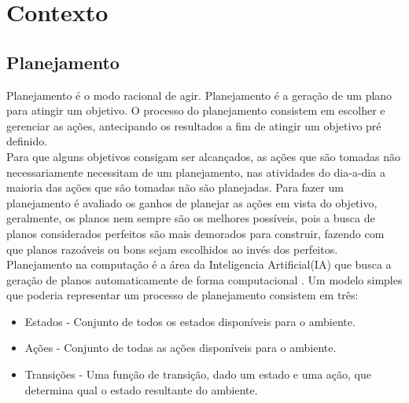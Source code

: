 \chapter{\label{chap:conte}Contexto}


\section{Planejamento} 


Planejamento é o modo racional de agir. Planejamento é a geração de um plano para atingir um objetivo. O processo do planejamento consistem em escolher e gerenciar as ações, antecipando os resultados a fim de atingir um objetivo pré definido. \\
Para que alguns objetivos consigam ser alcançados, as ações que são tomadas não necessariamente necessitam de um planejamento, nas atividades do dia-a-dia a maioria das ações que são tomadas não são planejadas. Para fazer um planejamento é avaliado os ganhos de planejar as ações em vista do objetivo, geralmente, os planos nem sempre são os melhores possíveis, pois a busca de planos considerados perfeitos são mais demorados para construir, fazendo com que planos razoáveis ou bons sejam escolhidos ao invés dos perfeitos. \\
Planejamento na computação é a área da Inteligencia Artificial(IA) que busca a geração de planos automaticamente de forma computacional \cite{ghallab2004automated}. Um modelo simples que poderia representar um processo de planejamento consistem em três:
 
\begin{itemize}
	\item Estados - Conjunto de todos os estados disponíveis para o ambiente. 
	\item Ações - Conjunto de todas as ações disponíveis para o ambiente.
	\item Transições - Uma função de transição, dado um estado e uma ação, que determina qual o estado resultante do ambiente.
\end{itemize}

